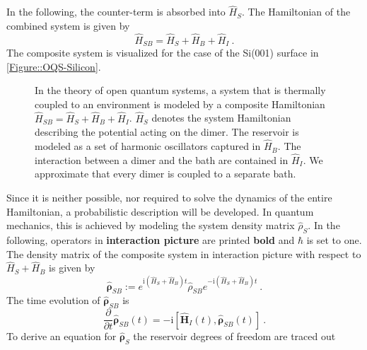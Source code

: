 	In the following, the counter-term is absorbed into $\hat{H}_S$. The Hamiltonian of the combined system is given by
	\begin{equation}
		\hat{H}_{SB} = \hat{H}_S + \hat{H}_B + \hat{H}_I~.
	\end{equation}
	The composite system is visualized for the case of the Si(001) surface in \autoref{Figure::OQS-Silicon}.
	\begin{figure}
		\centering
		
		\caption{In the theory of open quantum systems, a system that is thermally coupled to an environment is modeled by a composite Hamiltonian $\hat{H}_{SB} =	\hat{H}_S + \hat{H}_B + \hat{H}_I$. $\hat{H}_S$ denotes the system Hamiltonian describing the potential acting on the dimer. The reservoir is modeled as a set of harmonic oscillators captured in $\hat{H}_B$. The interaction between a dimer and the bath are contained in $\hat{H}_I$. We approximate that every dimer is coupled to a separate bath.}
		\label{Figure::OQS-Silicon}
	\end{figure}
	Since it is neither possible, nor required to solve the dynamics of the entire Hamiltonian, a probabilistic description will be developed. In quantum mechanics, this is achieved by modeling the system density matrix $\hat{\rho}_{S}$. In the following, operators in \textbf{interaction picture} are printed \textbf{bold} and $\hbar$ is set to one. The density matrix of the composite system in interaction picture with respect to $\hat{H}_S + \hat{H}_B$ is given by
	\begin{equation}
		\boldsymbol{\hat{\rho}}_{SB} :=	e^{\mathrm{i} \left(\hat{H}_S + \hat{H}_B\right)t} \hat{\rho}_{SB} e^{-\mathrm{i} \left(\hat{H}_S + \hat{H}_B\right)t} ~.
	\end{equation}
	 The time evolution of $\boldsymbol{\hat{\rho}}_{SB}$ is
	\begin{equation} \label{Eq::OQS-Startpoint}
		\frac{\partial}{\partial t}\boldsymbol{\hat{\rho}}_{SB}(t) =	- \mathrm{i} \left[\boldsymbol{\hat{H}}_I(t), \boldsymbol{\hat{\rho}}_{SB}(t) \right] ~.
	\end{equation}
	To derive an equation for $\boldsymbol{\hat{\rho}}_S$ the reservoir degrees of freedom are traced out
